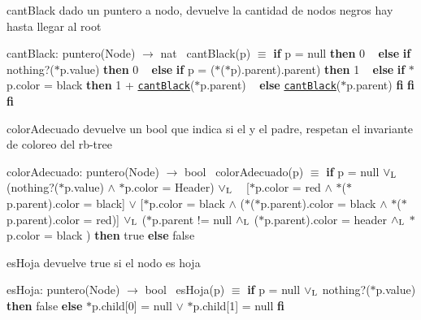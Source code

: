 \begin{DoxyParagraph}{cant\+Black}
dado un puntero a nodo, devuelve la cantidad de nodos negros hay hasta llegar al root

cant\+Black\+: puntero(\+Node) $\to$ nat~\newline
 cant\+Black(p) $\equiv$ {\bfseries if} p = null {\bfseries then} 0 ~\newline
 {\bfseries else} {\bfseries if} nothing?($\ast$p.value) {\bfseries then} 0 ~\newline
 {\bfseries else} {\bfseries if} p = ($\ast$($\ast$p).parent).parent) {\bfseries then} 1 ~\newline
 {\bfseries else} {\bfseries if} $\ast$p.color = black {\bfseries then} 1 + \href{axiomas.html#cantBlack}{\tt cant\+Black}($\ast$p.parent) ~\newline
 {\bfseries else} \href{axiomas.html#cantBlack}{\tt cant\+Black}($\ast$p.parent) {\bfseries fi} {\bfseries fi} {\bfseries fi} 
\end{DoxyParagraph}


\begin{DoxyParagraph}{color\+Adecuado}
devuelve un bool que indica si el y el padre, respetan el invariante de coloreo del rb-\/tree

color\+Adecuado\+: puntero(\+Node) $\to$ bool~\newline
 color\+Adecuado(p) $\equiv$ {\bfseries if} p = null $\lor_{\rm L}$ (nothing?($\ast$p.value) $\land$ $\ast$p.color = Header) $\lor_{\rm L}$ ~\newline
 \mbox{[}$\ast$p.color = red $\land$ $\ast$($\ast$p.parent).color = black\mbox{]} $\lor$ \mbox{[}$\ast$p.color = black $\land$ ($\ast$($\ast$p.parent).color = black $\land$ $\ast$($\ast$p.parent).color = red)\mbox{]} $\lor_{\rm L}$ ($\ast$p.parent != null $\land_{\rm L}$ ($\ast$p.parent).color = header $\land_{\rm L}$ $\ast$p.color = black ) {\bfseries then} true {\bfseries else} false 
\end{DoxyParagraph}


\begin{DoxyParagraph}{es\+Hoja}
devuelve true si el nodo es hoja

es\+Hoja\+: puntero(\+Node) $\to$ bool~\newline
 es\+Hoja(p) $\equiv$ {\bfseries if} p = null $\lor_{\rm L}$ nothing?($\ast$p.value) {\bfseries then} false {\bfseries else} $\ast$p.child\mbox{[}0\mbox{]} = null $\lor$ $\ast$p.child\mbox{[}1\mbox{]} = null {\bfseries fi} 
\end{DoxyParagraph}


